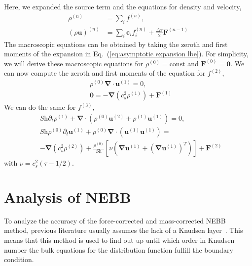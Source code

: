 \documentclass[aps,physrev,twocolumn,10pt]{revtex4-2}
\begin{document}
Here, we expanded the source term and the equations for density and velocity,
\begin{equation}
\begin{split}
    \rho^{(n)} &= \sum_i f^{(n)},\\
    \left(\rho \bm{u}\right)^{(n)} &= \sum_i \bm{c}_i f_i^{(n)} +  \frac{\Delta x}{2}\bm{F}^{(n-1)}
\end{split}
\end{equation}
The macroscopic equations can be obtained by taking the zeroth and first moments of the expansion in Eq.~(\ref{eq:asymptotic expansion lbe}). For simplicity, we will derive these macroscopic equations for $\rho^{(0)} = \text{const}$ and $\bm{F}^{(0)} = \bm{0}$. We can now compute the zeroth and first moments of the equation for $f^{(2)}$, 
\begin{equation}
\begin{split}
    & \rho^{(0)}\bm{\nabla}\cdot \bm{u}^{(1)} = 0,\\
    & \bm{0} =-\bm{\nabla} \left(c_s^2 \rho^{(1)}\right)+ \bm{F}^{(1)}
\end{split}
\end{equation}
We can do the same for $f^{(3)}$,
\begin{equation}
\begin{split}
    &\textit{Sh}\partial_t \rho^{(1)} + \bm{\nabla} \cdot \left(\rho^{(0)} \bm{u}^{(2)} + \rho^{(1)} \bm{u}^{(1)}\right) = 0,\\
    &\textit{Sh}\rho^{(0)}\partial_t \bm{u}^{(1)} + \rho^{(0)}\bm{\nabla}\cdot\left(\bm{u}^{(1)}\bm{u}^{(1)}\right) =\\
    &-\bm{\nabla} \left(c_s^2 \rho^{(2)}\right)  + \frac{\rho^{(0)}}{\textit{Sh}}\left[\nu \left(\bm{\nabla} \bm{u}^{(1)} + \left(\bm{\nabla} \bm{u}^{(1)}\right)^T\right)\right]+ \bm{F}^{(2)}
\end{split}
\end{equation}
with $\nu = c_s^2 (\tau - 1/2)$. 

\section{Analysis of NEBB}
To analyze the accuracy of the force-corrected and mass-corrected NEBB method, previous literature usually assumes the lack of a Knudsen layer~\cite{junk_asymptotic_2005}. This means that this method is used to find out up until which order in Knudsen number the bulk equations for the distribution function fulfill the boundary condition.
\end{document}
